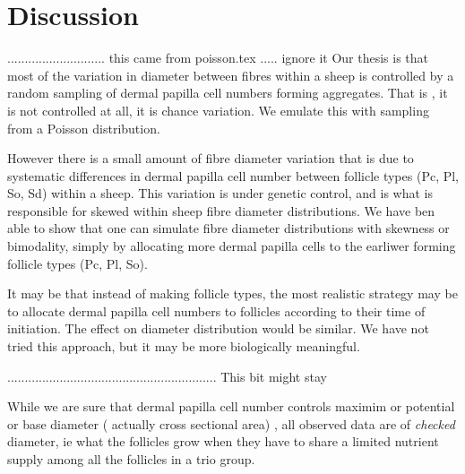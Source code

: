 \documentclass[titlepage]{article}  %
\begin{document}
\clearpage
\section{Discussion}

............................  this came from poisson.tex ..... ignore it
Our thesis is that most of the variation in diameter between fibres within a sheep is controlled by a random sampling of dermal papilla cell numbers forming aggregates. That is , it is not controlled at all, it is chance variation. We emulate this with sampling from a Poisson distribution.

However there is a small amount of fibre diameter variation that is due to systematic differences in dermal papilla cell number between follicle types (Pc, Pl, So, Sd) within a sheep. This variation is under genetic control, and is what is responsible for skewed within sheep fibre diameter distributions. We have ben able to show that one can simulate fibre diameter distributions with skewness or bimodality, simply by allocating more dermal papilla cells to the earliwer forming follicle types (Pc, Pl, So).

It may be that instead of making follicle types, the most realistic strategy may be to allocate dermal papilla cell numbers to follicles according to their time of initiation. The effect on diameter distribution would be similar. We have not tried this approach, but it may be more biologically meaningful.

............................................................
This bit might stay

While we are sure that dermal papilla cell number controls maximim or potential or base diameter ( actually cross sectional area) , all observed data are of {\em checked} diameter, ie what the follicles grow when they have to share a limited nutrient supply among all the follicles in a trio group.
\end{document}
